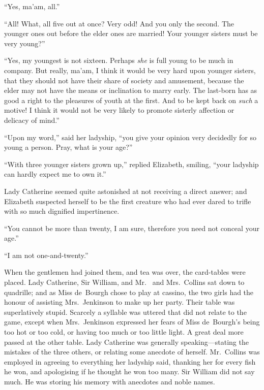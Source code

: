 ``Yes, ma'am, all.''

``All!  What, all five out at once?  Very odd!  And you only
the second.  The younger ones out before the elder ones are
married!  Your younger sisters must be very young?''

``Yes, my youngest is not sixteen.  Perhaps \emph{she} is full young to
be much in company.  But really, ma'am, I think it would be
very hard upon younger sisters, that they should not have their
share of society and amusement, because the elder may not have
the means or inclination to marry early.  The last-born has as
good a right to the pleasures of youth at the first.  And to be
kept back on \emph{such} a motive!  I think it would not be very likely
to promote sisterly affection or delicacy of mind.''

``Upon my word,'' said her ladyship, ``you give your opinion very
decidedly for so young a person.  Pray, what is your age?''

``With three younger sisters grown up,'' replied Elizabeth,
smiling, ``your ladyship can hardly expect me to own it.''

Lady Catherine seemed quite astonished at not receiving a direct
answer; and Elizabeth suspected herself to be the first creature
who had ever dared to trifle with so much dignified impertinence.

``You cannot be more than twenty, I am sure, therefore you need
not conceal your age.''

``I am not one-and-twenty.''

When the gentlemen had joined them, and tea was over, the
card-tables were placed.  Lady Catherine, Sir William, and Mr.\ %
and Mrs.\ Collins sat down to quadrille; and as Miss de~Bourgh
chose to play at cassino, the two girls had the honour of
assisting Mrs.\ Jenkinson to make up her party.  Their table was
superlatively stupid.  Scarcely a syllable was uttered that did
not relate to the game, except when Mrs.\ Jenkinson expressed her
fears of Miss de~Bourgh's being too hot or too cold, or having
too much or too little light.  A great deal more passed at the
other table.  Lady Catherine was generally speaking---stating
the mistakes of the three others, or relating some anecdote of
herself.  Mr.\ Collins was employed in agreeing to everything
her ladyship said, thanking her for every fish he won, and
apologising if he thought he won too many.  Sir William did not
say much.  He was storing his memory with anecdotes and noble
names.

